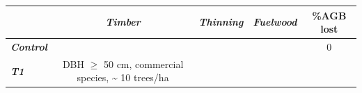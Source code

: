 \documentclass[fleqn,10pt]{ArtEcoFoG} %
\begin{document}
\begin{longtable}[]{@{}lcccc@{}}
\toprule
\begin{minipage}[b]{0.14\columnwidth}\raggedright\strut
\strut
\end{minipage} & \begin{minipage}[b]{0.17\columnwidth}\centering\strut
\textbf{\emph{Timber}}\strut
\end{minipage} & \begin{minipage}[b]{0.18\columnwidth}\centering\strut
\textbf{\emph{Thinning}}\strut
\end{minipage} & \begin{minipage}[b]{0.24\columnwidth}\centering\strut
\textbf{\emph{Fuelwood}}\strut
\end{minipage} & \begin{minipage}[b]{0.12\columnwidth}\centering\strut
\textbf{\%AGB lost}\strut
\end{minipage}\tabularnewline
\midrule
\endhead
\begin{minipage}[t]{0.14\columnwidth}\raggedright\strut
\textbf{\emph{Control}}\strut
\end{minipage} & \begin{minipage}[t]{0.17\columnwidth}\centering\strut
\strut
\end{minipage} & \begin{minipage}[t]{0.18\columnwidth}\centering\strut
\strut
\end{minipage} & \begin{minipage}[t]{0.24\columnwidth}\centering\strut
\strut
\end{minipage} & \begin{minipage}[t]{0.12\columnwidth}\centering\strut
0\strut
\end{minipage}\tabularnewline
\begin{minipage}[t]{0.14\columnwidth}\raggedright\strut
\textbf{\emph{T1}}\strut
\end{minipage} & \begin{minipage}[t]{0.17\columnwidth}\centering\strut
DBH \(\geq\) 50 cm, commercial species, \textasciitilde{} 10
trees/ha\strut
\end{minipage} & \begin{minipage}[t]{0.18\columnwidth}\centering\strut
\strut
\end{minipage} & \begin{minipage}[t]{0.24\columnwidth}\centering\strut
\strut
\end{minipage} & \begin{minipage}[t]{0.12\columnwidth}\centering\strut

\end{minipage}
\end{longtable}
\end{document}

